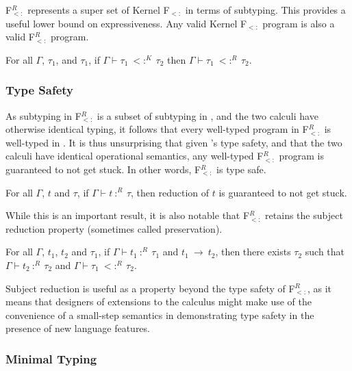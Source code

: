 \documentclass[runningheads, anon]{llncs}
\begin{document}
F$_{<:}^R$ represents a super set of Kernel F$_{<:}$ in terms of subtyping.
This provides a useful lower bound on expressiveness. Any valid Kernel F$_{<:}$ program 
is also a valid F$_{<:}^R$ program.

\begin{theorem}
For all $\Gamma$, $\tau_1$, and $\tau_1$, if $\Gamma \vdash \tau_1\ <:^K\ \tau_2$ then 
$\Gamma \vdash \tau_1\ <:^R\ \tau_2$.
\end{theorem}

\subsubsection{Type Safety}
As subtyping in F$_{<:}^R$ is a subset of subtyping in \Fsub, and the two calculi have otherwise identical 
typing, it follows that every well-typed program in F$_{<:}^R$ is well-typed in \Fsub. It is thus unsurprising 
that given \Fsub's type safety, and that the two calculi have identical operational semantics, any well-typed 
F$_{<:}^R$ program is guaranteed to not get stuck. In other words, F$_{<:}^R$ is type safe. 
\begin{theorem}
For all $\Gamma$, $t$ and $\tau$, if $\Gamma \vdash t\ :^R\ \tau$, then reduction of $t$ is guaranteed to 
not get stuck.
\end{theorem}
While this is an important result, it is also notable 
that F$_{<:}^R$ retains the subject reduction property \cite{10.1006/inco.1994.1093} 
(sometimes called preservation).
\begin{theorem}
For all $\Gamma$, $t_1$, $t_2$ and $\tau_1$, if $\Gamma \vdash t_1\ :^R\ \tau_1$ and $t_1\ \longrightarrow\ t_2$,
then there exists $\tau_2$ such that $\Gamma \vdash t_2\ :^R\ \tau_2$ and $\Gamma \vdash \tau_1\ <:^R\ \tau_2$.
\end{theorem}
Subject reduction is useful as a property beyond the type safety of F$_{<:}^R$, as it means that designers of 
extensions to the calculus might make use of the convenience of a small-step semantics in demonstrating 
type safety in the presence of new language features.


\subsubsection{Minimal Typing}
\end{document}
